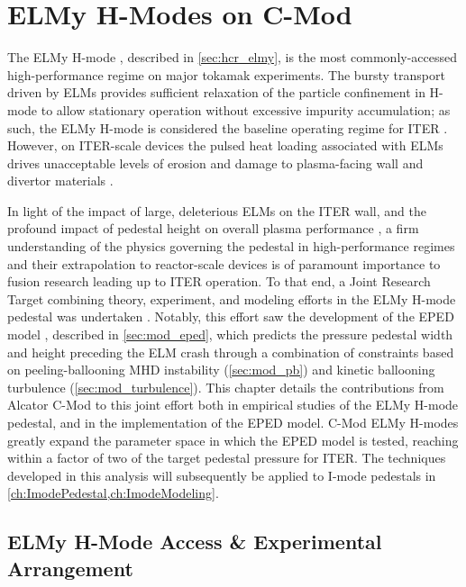 \chapter{ELMy H-Modes on C-Mod}\label{ch:Elmy}

The ELMy H-mode \cite{Wagner1982,Keilhacker1984}, described in \cref{sec:hcr_elmy}, is the most commonly-accessed high-performance regime on major tokamak experiments.  The bursty transport driven by ELMs provides sufficient relaxation of the particle confinement in H-mode to allow stationary operation without excessive impurity accumulation; as such, the ELMy H-mode is considered the baseline operating regime for ITER \cite{ITER1999,Shimada2007}.  However, on ITER-scale devices the pulsed heat loading associated with ELMs drives unacceptable levels of erosion and damage to plasma-facing wall and divertor materials \cite{Loarte2003,Federici2003}.

In light of the impact of large, deleterious ELMs on the ITER wall, and the profound impact of pedestal height on overall plasma performance \cite{Kinsey2011,Doyle2007}, a firm understanding of the physics governing the pedestal in high-performance regimes and their extrapolation to reactor-scale devices is of paramount importance to fusion research leading up to ITER operation.  To that end, a Joint Research Target combining theory, experiment, and modeling efforts in the ELMy H-mode pedestal was undertaken \cite{Groebner2013,JRT2011}.  Notably, this effort saw the development of the EPED model \cite{Snyder2009,Snyder2011,Snyder2009a}, described in \cref{sec:mod_eped}, which predicts the pressure pedestal width and height preceding the ELM crash through a combination of constraints based on peeling-ballooning MHD instability \cite{Snyder2004,Wilson2002,Wilson2006} (\cref{sec:mod_pb}) and kinetic ballooning turbulence \cite{Snyder2001} (\cref{sec:mod_turbulence}).  This chapter details the contributions from Alcator C-Mod to this joint effort \cite{Walk2012} both in empirical studies of the ELMy H-mode pedestal, and in the implementation of the EPED model.  C-Mod ELMy H-modes greatly expand the parameter space in which the EPED model is tested, reaching within a factor of two of the target pedestal pressure for ITER.  The techniques developed in this analysis will subsequently be applied to I-mode pedestals in \cref{ch:ImodePedestal,ch:ImodeModeling}.\nicesectionending

\section{ELMy H-Mode Access \& Experimental Arrangement}\label{sec:elmy_access}

